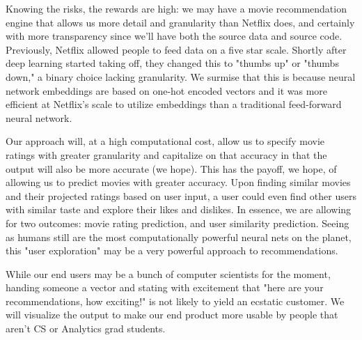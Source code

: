\documentclass[sigchi, 12pt, nonacm=true, timestamp=true, screen=true]{acmart}
\begin{document}
Knowing the risks, the rewards are high: we may have a movie recommendation engine that allows us more detail and granularity than Netflix does, and certainly with more transparency since we'll have both the source data and source code. Previously, Netflix allowed people to feed data on a five star scale. Shortly after deep learning started taking off, they changed this to "thumbs up" or "thumbs down," a binary choice lacking granularity. We surmise that this is because neural network embeddings are based on one-hot encoded vectors and it was more efficient at Netflix's scale to utilize embeddings than a traditional feed-forward neural network.

Our approach will, at a high computational cost, allow us to specify movie ratings with greater granularity and capitalize on that accuracy in that the output will also be more accurate (we hope). This has the payoff, we hope, of allowing us to predict movies with greater accuracy. Upon finding similar movies and their projected ratings based on user input, a user could even find other users with similar taste and explore their likes and dislikes. In essence, we are allowing for two outcomes: movie rating prediction, and user similarity prediction. Seeing as humans still are the most computationally powerful neural nets on the planet, this "user exploration" may be a very powerful approach to recommendations.

While our end users may be a bunch of computer scientists for the moment, handing someone a vector and stating with excitement that "here are your recommendations, how exciting!" is not likely to yield an ecstatic customer. We will visualize the output to make our end product more usable by people that aren't CS or Analytics grad students.

	








\end{document}

